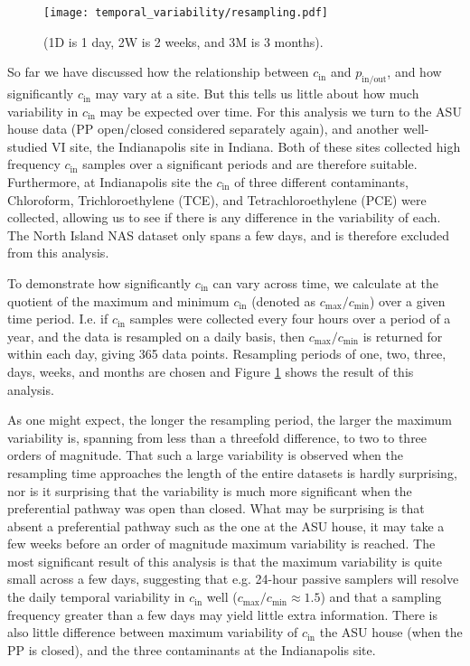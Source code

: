 \documentclass[journal=esthag,manuscript=article]{achemso}
\begin{document}
\begin{figure}[htb!] %
  \centering
  \caption{ (1D is 1 day, 2W is 2 weeks, and 3M is 3 months).}
  \label{fig:resampling}
  \texttt{[image: temporal\_variability/resampling.pdf]}
\end{figure}

So far we have discussed how the relationship between $c_\mathrm{in}$ and $p_\mathrm{in/out}$, and how significantly $c_\mathrm{in}$ may vary at a site.
But this tells us little about how much variability in $c_\mathrm{in}$ may be expected over time.
For this analysis we turn to the ASU house data (PP open/closed considered separately again), and another well-studied VI site, the Indianapolis site in Indiana.
Both of these sites collected high frequency $c_\mathrm{in}$ samples over a significant periods and are therefore suitable. %
Furthermore, at Indianapolis site the $c_\mathrm{in}$ of three different contaminants, Chloroform, Trichloroethylene (TCE), and Tetrachloroethylene (PCE) were collected, allowing us to see if there is any difference in the variability of each.
The North Island NAS dataset only spans a few days, and is therefore excluded from this analysis.

To demonstrate how significantly $c_\mathrm{in}$ can vary across time, we calculate at the quotient of the maximum and minimum $c_\mathrm{in}$ (denoted as $c_\mathrm{max}/c_\mathrm{min}$) over a given time period.
I.e. if $c_\mathrm{in}$ samples were collected every four hours over a period of a year, and the data is resampled on a daily basis, then $c_\mathrm{max}/c_\mathrm{min}$ is returned for within each day, giving 365 data points.
Resampling periods of one, two, three, days, weeks, and months are chosen and Figure \ref{fig:resampling} shows the result of this analysis.

As one might expect, the longer the resampling period, the larger the maximum variability is, spanning from less than a threefold difference, to two to three orders of magnitude.
That such a large variability is observed when the resampling time approaches the length of the entire datasets is hardly surprising, nor is it surprising that the variability is much more significant when the preferential pathway was open than closed.
What may be surprising is that absent a preferential pathway such as the one at the ASU house, it may take a few weeks before an order of magnitude maximum variability is reached.
The most significant result of this analysis is that the maximum variability is quite small across a few days, suggesting that e.g. 24-hour passive samplers will resolve the daily temporal variability in $c_\mathrm{in}$ well ($c_\mathrm{max}/c_\mathrm{min} \approx 1.5$) and that a sampling frequency greater than a few days may yield little extra information.
There is also little difference between maximum variability of $c_\mathrm{in}$ the ASU house (when the PP is closed), and the three contaminants at the Indianapolis site.
\end{document}

